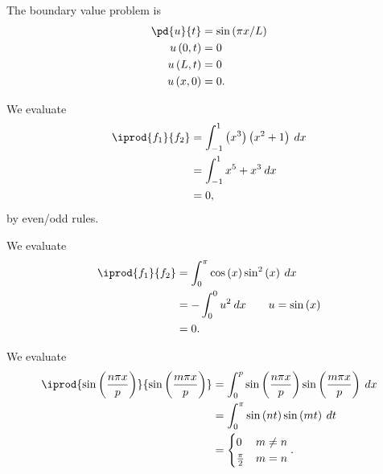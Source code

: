 \documentclass[10pt]{mypackage}
\begin{document}
\begin{solution}[12.2, Problem 6]
  The boundary value problem is
  \begin{align*}
    \pd{u}{t} &= \sin\left( \pi x/L \right)\\
    u\left( 0,t \right) &= 0\\
    u\left( L,t \right) &= 0\\
    u\left( x,0 \right) &= 0.
  \end{align*}
\end{solution}
\begin{solution}[11.1, Problem 2]
  We evaluate
  \begin{align*}
    \iprod{f_1}{f_2} &= \int_{-1}^{1} \left( x^3 \right)\left( x^2 + 1 \right)\:dx\\
                     &= \int_{-1}^{1} x^5 + x^3\:dx\\
                     &= 0,
  \end{align*}
  by even/odd rules.
\end{solution}
\begin{solution}[11.1, Problem 4]
  We evaluate
  \begin{align*}
    \iprod{f_1}{f_2} &= \int_{0}^{\pi} \cos\left( x \right)\sin^2\left( x \right)\:dx\\
                     &= - \int_{0}^{0} u^2\:dx\tag*{$u=\sin\left( x \right)$}\\
                     &= 0.
  \end{align*}
\end{solution}
\begin{solution}[11.1, Problem 10]
  We evaluate
  \begin{align*}
    \iprod{\sin\left( \frac{n\pi x}{p} \right)}{ \sin\left( \frac{m \pi x}{p} \right) } &= \int_{0}^{p} \sin\left( \frac{n\pi x}{p} \right) \sin\left( \frac{m\pi x}{p} \right)\:dx\\
                                                                                        &= \int_{0}^{\pi} \sin\left( nt \right)\sin\left( mt \right)\:dt\\
                                                                                        &= \begin{cases}
                                                                                          0 & m\neq n\\
                                                                                          \frac{\pi}{2} & m=n
                                                                                        \end{cases}.
  \end{align*}
\end{solution}
\end{document}
